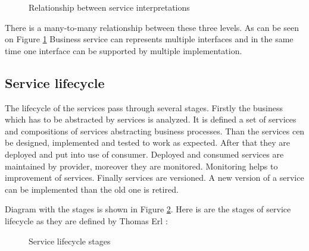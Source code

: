 \begin{figure}[htp] 
\caption{Relationship between service interpretations}
\label{fig:service-levels}
\end{figure}

There is a many-to-many relationship between these three levels. As can be seen on Figure \ref{fig:service-levels} Business service can represents multiple interfaces and in the same time one interface can be supported by multiple implementation.

\subsection{Service lifecycle}
\label{subsec:lifecycle}
The lifecycle of the services pass through several stages. Firstly the business which has to be abstracted by services is analyzed. It is defined a set of services and compositions of services abstracting business processes. Than the services cen be designed, implemented and tested to work as expected. After that they are deployed and put into use of consumer. Deployed and consumed services are maintained by provider, moreover they are monitored. Monitoring helps to improvement of services. Finally services are versioned. A new version of a service can be implemented than the old one is retired.

Diagram with the stages is shown in Figure \ref{fig:service-lifecycle}. Here is are the stages of service lifecycle as they are defined by Thomas Erl \cite{soa-governance}:

\begin{figure}[htp] 
\caption{Service lifecycle stages}
\label{fig:service-lifecycle}
\end{figure}


